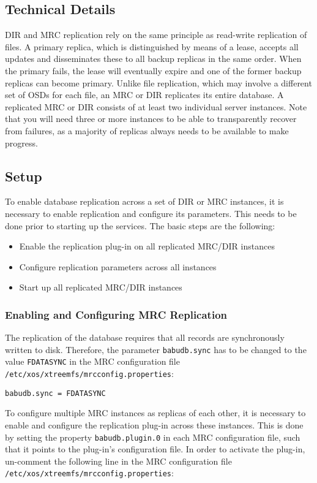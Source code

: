\documentclass[a4paper,10pt]{book}
\begin{document}
\subsection{Technical Details}
DIR and MRC replication rely on the same principle as read-write replication of files. A primary replica, which is distinguished by means of a lease, accepts all updates and disseminates these to all backup replicas in the same order. When the primary fails, the lease will eventually expire and one of the former backup replicas can become primary. Unlike file replication, which may involve a different set of OSDs for each file, an MRC or DIR replicates its entire database. A replicated MRC or DIR consists of at least two individual server instances. Note that you will need three or more instances to be able to transparently recover from failures, as a majority of replicas always needs to be available to make progress.

\subsection{Setup}
To enable database replication across a set of DIR or MRC instances, it is necessary to enable replication and configure its parameters. This needs to be done prior to starting up the services. The basic steps are the following:

\begin{itemize}
 \item Enable the replication plug-in on all replicated MRC/DIR instances
 \item Configure replication parameters across all instances
 \item Start up all replicated MRC/DIR instances
\end{itemize}

\subsubsection{Enabling and Configuring MRC Replication}
The replication of the database requires that all records are synchronously written to disk. Therefore, the parameter \texttt{babudb.sync} has to be changed to the value \texttt{FDATASYNC} in the MRC configuration file \texttt{/etc/xos/xtreemfs/mrcconfig.properties}:
\begin{verbatim}
babudb.sync = FDATASYNC
\end{verbatim}

To configure multiple MRC instances as replicas of each other, it is necessary to enable and configure the replication plug-in across these instances. This is done by setting the property \texttt{babudb.plugin.0} in each MRC configuration file, such that it points to the plug-in's configuration file. In order to activate the plug-in, un-comment the following line in the MRC configuration file \texttt{/etc/xos/xtreemfs/mrcconfig.properties}:
\end{document}
